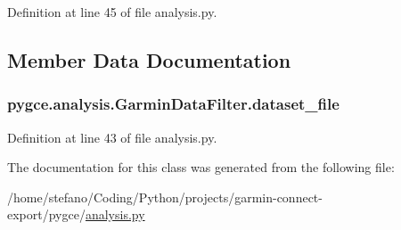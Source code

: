 Definition at line 45 of file analysis.\+py.



\subsection{Member Data Documentation}
\subsubsection[{\texorpdfstring{dataset\+\_\+file}{dataset_file}}]{\setlength{\rightskip}{0pt plus 5cm}pygce.\+analysis.\+Garmin\+Data\+Filter.\+dataset\+\_\+file}\hypertarget{classpygce_1_1analysis_1_1_garmin_data_filter_a1d609bdd447d36bafce41e43586540ef}{}\label{classpygce_1_1analysis_1_1_garmin_data_filter_a1d609bdd447d36bafce41e43586540ef}


Definition at line 43 of file analysis.\+py.



The documentation for this class was generated from the following file\+:\begin{DoxyCompactItemize}
\item 
/home/stefano/\+Coding/\+Python/projects/garmin-\/connect-\/export/pygce/\hyperlink{analysis_8py}{analysis.\+py}\end{DoxyCompactItemize}
